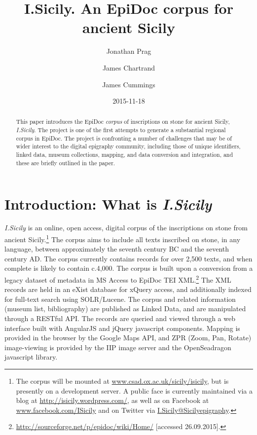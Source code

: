 \documentclass[amsthm,ebook]{saparticle}
\title{I.Sicily. An EpiDoc corpus for ancient Sicily}
\author[OXF]{Jonathan Prag\corref{first}}
\author[opensky]{James Chartrand}
\author[OXF]{James Cummings}
\date{2015-11-18}
\begin{document}
\maketitle
\begin{abstract}
This paper introduces the EpiDoc \emph{corpus} of inscriptions on stone for ancient Sicily, \emph{I.Sicily}. The project is one of the
first attempts to generate a substantial regional corpus in EpiDoc. The project is confronting a number of challenges
that may be of wider interest to the digital epigraphy community, including those of unique identifiers, linked data,
museum collections, mapping, and data conversion and integration, and these are briefly outlined in the paper.
\end{abstract}




\section{Introduction: What is \emph{I.Sicily}}
\noindent \emph{I.Sicily} is an online, open access, digital corpus of the inscriptions on stone from ancient Sicily.\footnote{ The
corpus will be mounted at \url{www.csad.ox.ac.uk/sicily/isicily}, but is presently on a development server. A public face is
currently maintained via a blog at \url{http://isicily.wordpress.com/}, as well as on Facebook at \url{www.facebook.com/ISicily}
and on Twitter via \url{I.Sicily@Sicilyepigraphy}.} The corpus aims to include all texts inscribed on stone, in any language,
between approximately the seventh century BC and the seventh century AD. The corpus currently contains records for over
2,500 texts, and when complete is likely to contain c.4,000. The corpus is built upon a conversion from a legacy
dataset of metadata in MS Access to EpiDoc TEI XML.\footnote{\url{http://sourceforge.net/p/epidoc/wiki/Home/} [accessed
26.09.2015].} The XML records are held in an eXist database for xQuery access, and additionally indexed for full-text
search using SOLR/Lucene. The corpus and related information (museum list, bibliography) are published as Linked Data,
and are manipulated through a RESTful API. The records are queried and viewed through a web interface built with
AngularJS and jQuery javascript components. Mapping is provided in the browser by the Google Maps API, and ZPR (Zoom,
Pan, Rotate) image-viewing is provided by the IIP image server and the OpenSeadragon javascript library.
\end{document}

